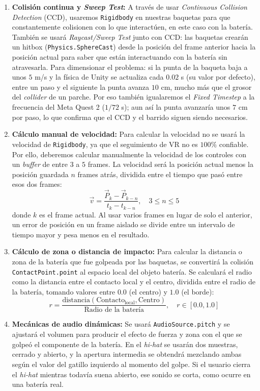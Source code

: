 \documentclass{article}
\begin{document}
\begin{enumerate}
    \item \textbf{Colisión continua y \textit{Sweep Test}:} A través de usar \textit{Continuous Collision Detection} (CCD), usaremos \texttt{Rigidbody} en nuestras baquetas para que constantemente colisionen con lo que interactúen, en este caso con la batería. También se usará \textit{Raycast/Sweep Test} junto con CCD: las baquetas crearán un hitbox (\texttt{Physics.SphereCast}) desde la posición del frame anterior hacia la posición actual para saber que están interactuando con la batería sin atravesarla. Para dimensionar el problema: si la punta de la baqueta baja a unos $5$ m/s y la física de Unity se actualiza cada $0.02$ s (su valor por defecto), entre un paso y el siguiente la punta avanza $10$ cm, mucho más que el grosor del \textit{collider} de un parche. Por eso también igualaremos el \textit{Fixed Timestep} a la frecuencia del Meta Quest 2 ($1/72$ s); aun así la punta avanzaría unos $7$ cm por paso, lo que confirma que el CCD y el barrido siguen siendo necesarios.
    \item \textbf{Cálculo manual de velocidad:} Para calcular la velocidad no se usará la velocidad de \texttt{Rigidbody}, ya que el seguimiento de VR no es $100\%$ confiable. Por ello, deberemos calcular manualmente la velocidad de los controles con un \textit{buffer} de entre $3$ a $5$ frames. La velocidad será la posición actual menos la posición guardada $n$ frames atrás, dividida entre el tiempo que pasó entre esos dos frames:
    \[
    \vec{v} = \frac{\vec{P}_{k} - \vec{P}_{k-n}}{t_{k} - t_{k-n}}, \quad 3 \le n \le 5
    \]
    donde $k$ es el frame actual. Al usar varios frames en lugar de solo el anterior, un error de posición en un frame aislado se divide entre un intervalo de tiempo mayor y pesa menos en el resultado.
    \item \textbf{Cálculo de zona o distancia de impacto:} Para calcular la distancia o zona de la batería que fue golpeada por las baquetas, se convertirá la colisión \texttt{ContactPoint.point} al espacio local del objeto batería. Se calculará el radio como la distancia entre el contacto local y el centro, dividida entre el radio de la batería, tomando valores entre $0.0$ (el centro) y $1.0$ (el borde):
    \[
    r = \frac{\text{distancia}(\text{Contacto}_{\text{local}}, \text{Centro})}{\text{Radio de la batería}}, \quad r \in [0.0, 1.0]
    \]
    \item \textbf{Mecánicas de audio dinámicas:} Se usará \texttt{AudioSource.pitch} y se ajustará el volumen para producir el efecto de fuerza y zona con el que se golpeó el componente de la batería. En el \textit{hi-hat} se usarán dos muestras, cerrado y abierto, y la apertura intermedia se obtendrá mezclando ambas según el valor del gatillo izquierdo al momento del golpe. Si el usuario cierra el \textit{hi-hat} mientras todavía suena abierto, ese sonido se corta, como ocurre en una batería real.
\end{enumerate}
\end{document}
